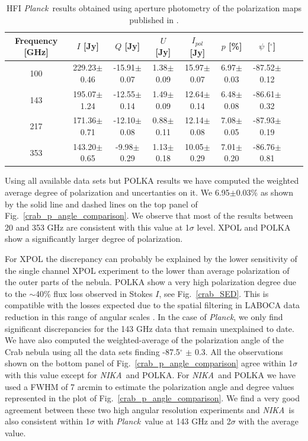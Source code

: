 \documentclass[twocolumn,traditabstract]{aa}
\def\NIKA{\textit{NIKA}}
\def\Planck{\textit{Planck}}
\begin{document}
\begin{table}
  \centering
      \begin{tabular}{ccccccccc}
      \hline
      \hline
       Frequency [GHz] & \small $I$ [Jy] & \small $Q$ [Jy] & \small $U$ [Jy] & \small $I_{pol}$ [Jy] & \small $p$ [\%] & \small $\psi$ [$^\circ$] \\
      \hline

\small 100 & \small 229.23$\pm$0.46  & \small -15.91$\pm$0.07 & \small 1.38$\pm$0.09 & \small 15.97$\pm$0.07 & \small 6.97$\pm$0.03 & \small -87.52$\pm$0.12  \\ 
\small 143 & \small 195.07$\pm$1.24  & \small -12.55$\pm$0.14 & \small 1.49$\pm$0.09 & \small 12.64$\pm$0.14 & \small 6.48$\pm$0.08 & \small -86.61$\pm$0.32  \\
\small 217 & \small 171.36$\pm$0.71  & \small -12.10$\pm$0.08 & \small 0.88$\pm$0.11 & \small 12.14$\pm$0.08 & \small 
7.08$\pm$0.05 & \small -87.93$\pm$0.19  \\
\small 353 & \small 143.20$\pm$0.65  & \small -9.98$\pm$0.29 & \small 1.13$\pm$0.18 & \small 10.05$\pm$0.29 & \small 7.01$\pm$0.20 & \small -86.76$\pm$0.81 \\
    \hline            
    \hline   
    \end{tabular}
   \caption{ HFI \Planck\ results obtained using aperture photometry of the polarization maps published in \cite{refId0}.}
    \label{tab:planck_results}
 \end{table}
 
Using all available data sets but POLKA results we have computed the weighted average degree of polarization and uncertanties on it.
We 6.95$\pm$0.03$\%$ as shown by the solid line and dashed lines on the top panel of Fig.~\ref{crab_p_angle_comparison}. We observe that most of the results between 20 and 353 GHz are consistent with this value at 1$\sigma$ level. XPOL and POLKA show a significantly larger degree of polarization.

For XPOL the discrepancy can
probably be explained by the lower sensitivity of the single channel XPOL
experiment to the lower than average polarization of the outer parts of the
nebula.
POLKA show a very high polarization degree due to the $\sim$40\% flux loss observed in Stokes $I$, see Fig.~\ref{crab_SED}. This is compatible with the losses expected due to the spatial filtering in LABOCA data reduction in this range of angular scales \citep{2011A&A...527A.145B}.
In the case of \Planck, we only find significant discrepancies for the 143 GHz data that remain unexplained to date.
We have also computed the weighted-average of the polarization angle of the Crab nebula using all the data sets finding -87.5$^{\circ}$ $\pm$ 0.3.  
All the observations shown on the bottom panel of
Fig.~\ref{crab_p_angle_comparison} agree within 1$\sigma$ with this value except for \NIKA\ and POLKA.
For \NIKA\ and POLKA we have used a FWHM of 7 arcmin to estimate the polarization angle and degree values represented in the plot of Fig.~\ref{crab_p_angle_comparison}. We find a very good agreement between these two high angular resolution experiments and \NIKA\ is also consistent within 1$\sigma$ with \Planck\ value at 143 GHz and 2$\sigma$ with the average value.
\end{document}
